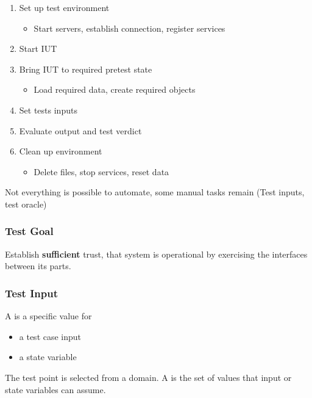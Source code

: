 \documentclass[
    ../../Software_Engineering_Summary.tex,
]
{subfiles}
\begin{document}
\begin{defbox}
    \begin{enumerate}
        \item Set up test environment
        \begin{itemize}
            \item Start servers, establish connection, register services
        \end{itemize}
        \item Start IUT
        \item Bring IUT to required pretest state
        \begin{itemize}
            \item Load required data, create required objects
        \end{itemize}
        \item Set tests inputs
        \item Evaluate output and test verdict
        \item Clean up environment
        \begin{itemize}
            \item Delete files, stop services, reset data
        \end{itemize}
    \end{enumerate}

    Not everything is possible to automate, some manual tasks remain (Test inputs, test oracle)
\end{defbox}

\subsubsection{Test Goal}
\begin{defbox*}
    Establish \textbf{sufficient} trust, that system is operational by exercising the interfaces between its parts.
\end{defbox*}

\subsubsection{Test Input}
\begin{defbox}
    A  is a specific value for 
    \begin{itemize}
        \item a test case input
        \item a state variable
    \end{itemize}
    The test point is selected from a domain. A  is the set of values that input or state variables can assume.
\end{defbox}
\end{document}

